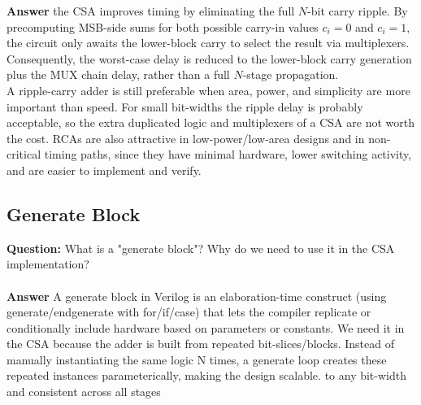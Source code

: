 \documentclass[12pt]{article}
\begin{document}
\noindent \textbf{Answer} the CSA improves timing by eliminating the full $N$-bit carry ripple. By precomputing MSB-side sums for both possible carry-in values $c_i = 0$ and $c_i = 1$, the circuit only awaits the lower-block carry to select the result via multiplexers. Consequently, the worst-case delay is reduced to the lower-block carry generation plus the MUX chain delay, rather than a full $N$-stage propagation.\\
A ripple-carry adder is still preferable when area, power, and simplicity are more important than speed. For small bit-widths the ripple delay is probably acceptable, so the extra duplicated logic and multiplexers of a CSA are not worth the cost. RCAs are also attractive in low-power/low-area designs and in non-critical timing paths, since they have minimal hardware, lower switching activity, and are easier to implement and verify.


\subsection{Generate Block}

\noindent \textbf{Question:} What is a "generate block"? Why do we need to use it in the CSA implementation?\\\\
\noindent \textbf{Answer} A generate block in Verilog is an elaboration-time construct (using
generate/endgenerate with for/if/case) that lets the compiler replicate or conditionally include hardware based on parameters or constants. We need it in the CSA because
the adder is built from repeated bit-slices/blocks. Instead of manually instantiating the same logic N times, a
generate loop creates these repeated instances parameterically, making the design scalable.
to any bit-width and consistent across all stages \\\\

\end{document}
